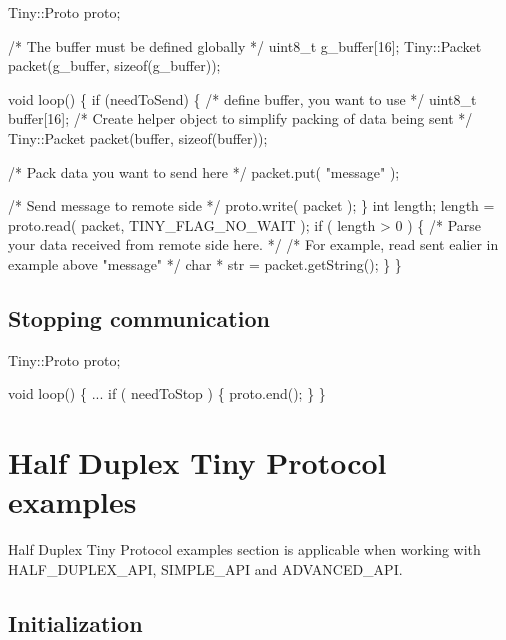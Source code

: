 \begin{DoxyCode}
Tiny::Proto proto;

\textcolor{comment}{/* The buffer must be defined globally */}
uint8\_t g\_buffer[16];
Tiny::Packet packet(g\_buffer, \textcolor{keyword}{sizeof}(g\_buffer));

\textcolor{keywordtype}{void} loop()
\{
    \textcolor{keywordflow}{if} (needToSend)
    \{
        \textcolor{comment}{/* define buffer, you want to use */}
        uint8\_t buffer[16];
        \textcolor{comment}{/* Create helper object to simplify packing of data being sent */}
        Tiny::Packet packet(buffer, \textcolor{keyword}{sizeof}(buffer));

        \textcolor{comment}{/* Pack data you want to send here */}
        packet.put( \textcolor{stringliteral}{"message"} );

        \textcolor{comment}{/* Send message to remote side */}
        proto.write( packet );
    \}
    \textcolor{keywordtype}{int} length;
    length = proto.read( packet, TINY\_FLAG\_NO\_WAIT );
    \textcolor{keywordflow}{if} ( length > 0 )
    \{
        \textcolor{comment}{/* Parse your data received from remote side here. */}
        \textcolor{comment}{/* For example, read sent ealier in example above "message" */}
        \textcolor{keywordtype}{char} * str = packet.getString();
    \}
\}
\end{DoxyCode}
\hypertarget{arduino_arduino_tiny_close}{}\subsection{Stopping communication}\label{arduino_arduino_tiny_close}

\begin{DoxyCode}
Tiny::Proto proto;

\textcolor{keywordtype}{void} loop()
\{
    ...
    \textcolor{keywordflow}{if} ( needToStop )
    \{
        proto.end();
    \}
\}
\end{DoxyCode}
\hypertarget{arduino_arduino_tiny_hd}{}\section{Half Duplex Tiny Protocol examples}\label{arduino_arduino_tiny_hd}
Half Duplex Tiny Protocol examples section is applicable when working with H\+A\+L\+F\+\_\+\+D\+U\+P\+L\+E\+X\+\_\+\+A\+PI, S\+I\+M\+P\+L\+E\+\_\+\+A\+PI and A\+D\+V\+A\+N\+C\+E\+D\+\_\+\+A\+PI.\hypertarget{arduino_arduino_tiny_hd_init}{}\subsection{Initialization}\label{arduino_arduino_tiny_hd_init}


